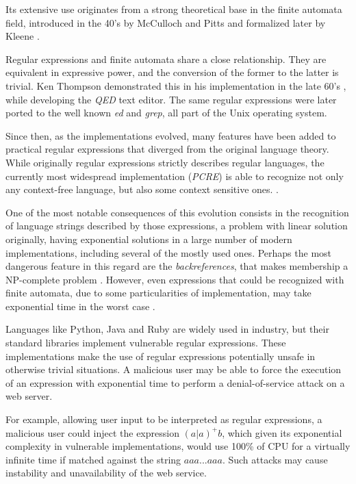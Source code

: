 \documentclass{llncs}
\begin{document}
Its extensive use originates from a strong theoretical base in the finite automata field, introduced in the 40's by McCulloch and Pitts \cite{bib:McCulloch43} and formalized later by Kleene \cite{bib:Kleene56}.

Regular expressions and finite automata share a close relationship. They are equivalent in expressive power, and the conversion of the former to the latter is trivial. Ken Thompson demonstrated this in his implementation in the late 60's \cite{bib:Thompson68}, while developing the \emph{QED} text editor. The same regular expressions were later ported to the well known \emph{ed} and \emph{grep}, all part of the Unix operating system. 

Since then, as the implementations evolved, many features have been added to practical regular expressions that diverged from the original language theory. While originally regular expressions strictly describes regular languages, the currently most widespread implementation (\emph{PCRE}) is able to recognize not only any context-free language, but also some context sensitive ones. \cite{bib:Nikita12}.

One of the most notable consequences of this evolution consists in the recognition of language strings described by those expressions, a problem with linear solution originally, having exponential solutions in a large number of modern implementations, including several of the mostly used ones. Perhaps the most dangerous feature in this regard are the \emph{backreferences}, that makes membership a NP-complete problem \cite{bib:Campeanu07}. However, even expressions that could be recognized with finite automata, due to some particularities of implementation, may take exponential time in the worst case \cite{bib:Cox07}.

Languages like Python, Java and Ruby are widely used in industry, but their standard libraries implement vulnerable regular expressions. These implementations make the use of regular expressions potentially unsafe in otherwise trivial situations. A malicious user may be able to force the execution of an expression with exponential time to perform a denial-of-service attack on a web server.

For example, allowing user input to be interpreted as regular expressions, a malicious user could inject the expression $(a|a)^+b$, which given its exponential complexity in vulnerable implementations, would use 100\% of CPU for a virtually infinite time if matched against the string $aaa...aaa$. Such attacks may cause instability and unavailability of the web service. 
\end{document}
